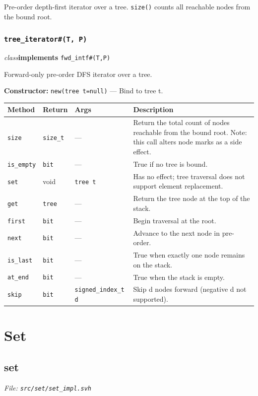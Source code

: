 \documentclass[11pt,letterpaper]{report}
\begin{document}
Pre-order depth-first iterator over a tree. \texttt{size()} counts all reachable nodes from the bound root.

\subsection*{\texttt{tree\_iterator\#(T, P)}}
\noindent\small\textit{class}\quad \textbf{implements} \texttt{fwd\_intf\#(T,P)}\par

Forward-only pre-order DFS iterator over a tree.

\noindent\textbf{Constructor:} \texttt{new(tree t=null)} --- Bind to tree t.

\begin{xltabular}{\linewidth}{>{\small}p{1.35in} >{\small}p{1.25in} >{\small}p{0.95in} >{\small}X}
\toprule
\textbf{Method} & \textbf{Return} & \textbf{Args} & \textbf{Description} \\
\midrule
\endhead
\bottomrule
\endfoot
\texttt{size} & \texttt{size\_t} & --- & Return the total count of nodes reachable from the bound root. Note: this call alters node marks as a side effect. \\
\texttt{is\_empty} & \texttt{bit} & --- & True if no tree is bound. \\
\texttt{set} & void & \texttt{tree t} & Has no effect; tree traversal does not support element replacement. \\
\texttt{get} & \texttt{tree} & --- & Return the tree node at the top of the stack. \\
\texttt{first} & \texttt{bit} & --- & Begin traversal at the root. \\
\texttt{next} & \texttt{bit} & --- & Advance to the next node in pre-order. \\
\texttt{is\_last} & \texttt{bit} & --- & True when exactly one node remains on the stack. \\
\texttt{at\_end} & \texttt{bit} & --- & True when the stack is empty. \\
\texttt{skip} & \texttt{bit} & \texttt{signed\_index\_t d} & Skip d nodes forward (negative d not supported). \\
\end{xltabular}

\chapter{Set}
\section{set}
\noindent\small\textit{File: \texttt{src/set/set\_impl.svh}}\par
\end{document}
